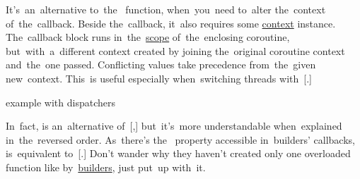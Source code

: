 It's~an~alternative to~the~ function, when~you~need to~alter the~context of~the~callback.
Beside the~callback, it~also requires some \hyperref[kotlincoroutinecontext]{context} instance.
The~callback block runs in~the~\hyperref[kotlincoroutinescope]{scope} of~the~enclosing coroutine, but~with~a~different context created by joining the~original coroutine context and~the~one passed.
Conflicting values take precedence from~the~given new~context.
This~is useful especially when~switching threads with~[.]

\todo example with dispatchers

\note In~fact,  is an~alternative of~[,] but~it's~more understandable when~explained in~the~reversed order.
As~there's the~ property accessible in~builders' callbacks,  is~equivalent to~[.]
Don't wander why they haven't created only one overloaded function like by~\hyperref[kotlincoroutinebuilder]{builders}, just put~up with~it.
